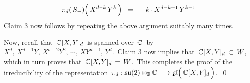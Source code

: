\begin{enumerate}
	\begin{equation*}
	\pi_{d}\!\left(\,S_{-}\right)\!\left(\,\overset{{\color{.}}}{X^{d-k}}\,Y^{k}\,\right)
	\;\; = \;\;
		 -\,k \cdot X^{d-k+1} \, Y^{k-1}
	\end{equation*}
	Claim 3 now follows by repeating the above argument suitably many times.
	
	\vskip 0.5cm
	\noindent
	Now, recall that
	\,$\mathbb{C}[X,Y]_{d}$\,
	is spanned over \,$\mathbb{C}$\, by
	\,$X^{d},\, X^{d-1}Y,\, X^{d-2}Y^{2},\, \cdots,\, XY^{d-1},\, Y^{d}$.\,
	Claim 3 now implies that \,$\mathbb{C}[X,Y]_{d} \,\subset\, W$,\,
	which in turn proves that
	\,$\mathbb{C}[X,Y]_{d} \,=\, W$.\
	This completes the proof of the irreducibility of the representation
	\,$\pi_{d} : \su(2) \otimes_{\Re} \C \longrightarrow \gl\!\left(\,\overset{{\color{white}.}}{\C}[X,Y]_{d}\,\right)$.\,
	\qed
\end{enumerate}


